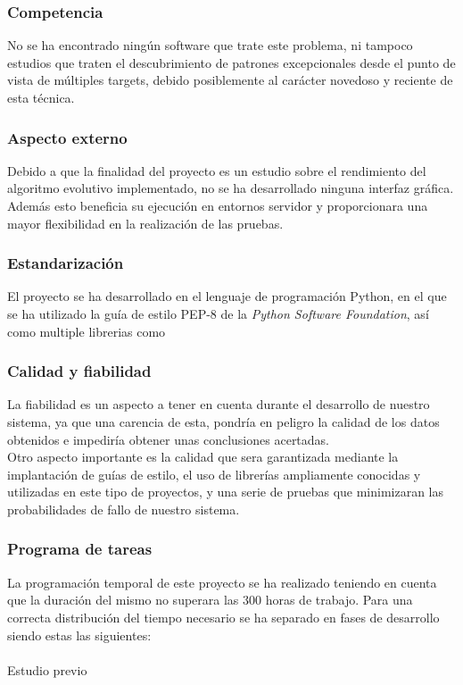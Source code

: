 \documentclass[a4paper, 12pt]{book}
\begin{document}
\subsubsection{Competencia}
No se ha encontrado ningún software que trate este problema, ni tampoco estudios que traten el descubrimiento de patrones excepcionales desde el punto de vista de múltiples targets, debido posiblemente al carácter novedoso y reciente de esta técnica.

\subsubsection{Aspecto externo}
Debido a que la finalidad del proyecto es un estudio sobre el rendimiento del algoritmo evolutivo implementado, no se ha desarrollado ninguna interfaz gráfica. Además esto beneficia su ejecución en entornos servidor y proporcionara una mayor flexibilidad en la realización de las pruebas.

\subsubsection{Estandarización}
El proyecto se ha desarrollado en el lenguaje de programación Python, en el que se ha utilizado la guía de estilo PEP-8 \cite{} de la \textit{Python Software Foundation}, así como multiple librerias como 
\subsubsection{Calidad y fiabilidad}
La fiabilidad es un aspecto a tener en cuenta durante el desarrollo de nuestro sistema, ya que una carencia de esta, pondría en peligro la calidad de los datos obtenidos e impediría obtener unas conclusiones acertadas.\\

Otro aspecto importante es la calidad que sera garantizada mediante la implantación de guías de estilo, el uso de librerías ampliamente conocidas y utilizadas en este tipo de proyectos, y una serie de pruebas que minimizaran las probabilidades de fallo de nuestro sistema.


\subsubsection{Programa de tareas}
La programación temporal de este proyecto se ha realizado teniendo en cuenta que la duración del mismo no superara las 300 horas de trabajo. Para una correcta distribución del tiempo necesario se ha separado en fases de desarrollo siendo estas las siguientes:\\
\\
Estudio previo\\
\end{document}
